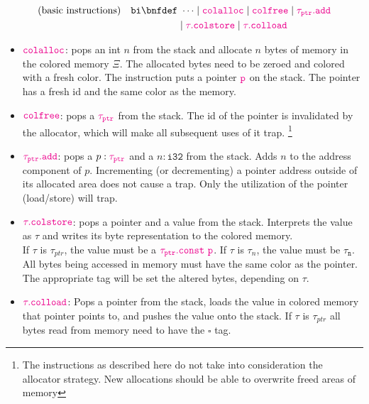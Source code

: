 \documentclass{article}
\newcommand{\ws}[1]{\mathtt{#1}}
\newcommand{\newt}[1]{\mathtt{\color{magenta}{#1}}}
\newcommand{\numt}{\tau_n}      %
\newcommand{\ptrt}{\tau_{ptr}}  %
\newcommand{\addrt}{i32}
\newcommand{\tagptr}{\square}
\newcommand{\te}[1]{\text{#1}}
\begin{document}
\begin{align*}
    \te{(basic instructions)} && \ws{bi} \bnfdef&\ \dots \mid
    \newt{colalloc} \mid
    \newt{colfree} \mid
    \newt{\ptrt.add} \\ &&&
    \mid \newt{\tau.colstore} \mid
    \newt{\tau.colload}
\end{align*}

\begin{itemize}
    \item $\newt{colalloc}$: pops an int $n$ from the stack and allocate $n$ bytes
        of memory in the colored memory $\Xi$. The allocated bytes need to be zeroed
        and colored with a fresh color. The instruction puts a pointer $\newt{p}$ on
        the stack. The pointer has a fresh id and the same color as the memory.
    \item $\newt{colfree}$: pops a $\newt{\ptrt}$ from the stack. The id of the pointer
        is invalidated by the allocator, which will make all subsequent uses of it
        trap.
        \footnote{The instructions as described here do not take into consideration
            the allocator strategy. New allocations should be able to overwrite freed
        areas of memory}
    \item $\newt{\ptrt.add}$: pops a $p: \newt{\ptrt}$ and a $n: \ws{\addrt}$ from the
        stack. Adds $n$ to the address component of $p$. Incrementing (or
        decrementing) a pointer address outside of its allocated area does not cause
        a trap. Only the utilization of the pointer (load/store) will trap.
    \item $\newt{\tau.colstore}$: pops a pointer and a value from the stack. Interprets
        the value as $\tau$ and writes its byte representation to the colored memory.\\
        If $\tau$ is $\ptrt$, the value must be a $\newt{\ptrt.const\ p}$. If $\tau$
        is $\numt$, the value must be $\ws{\numt}$.\\
        All bytes being accessed in memory must have the same color as the pointer.
        The appropriate tag will be set the altered bytes, depending on $\tau$.
    \item $\newt{\tau.colload}$: Pops a pointer from the stack, loads the value in
        colored memory that pointer points to, and pushes the value onto the stack.
        If $\tau$ is $\ptrt$ all bytes read from memory need to have the $\tagptr$ tag.
\end{itemize}
\end{document}
